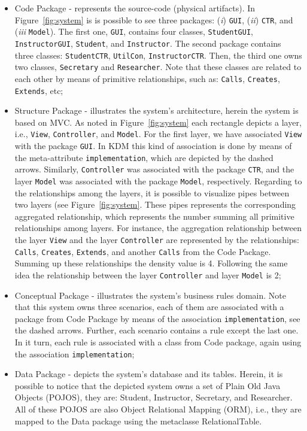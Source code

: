 \begin{itemize}

\item Code Package - represents the source-code (physical artifacts). In Figure~\ref{fig:system} is is possible to see three packages: (\textit{i}) \texttt{GUI}, (\textit{ii}) \texttt{CTR}, and (\textit{iii} \texttt{Model}). The first one, \texttt{GUI}, contains four classes, \texttt{StudentGUI}, \texttt{InstructorGUI}, \texttt{Student}, and \texttt{Instructor}. The second package contains three classes: \texttt{StudentCTR}, \texttt{UtilCon}, \texttt{InstructorCTR}. Then, the third one owns two classes, \texttt{Secretary} and \texttt{Researcher}. Note that these classes are related to each other by means of primitive relationships, such as: \texttt{Calls}, \texttt{Creates}, \texttt{Extends}, etc;

\item Structure Package - illustrates the system's architecture, herein the system is based on MVC. As noted in Figure~\ref{fig:system} each rectangle depicts a layer, i.e., \texttt{View}, \texttt{Controller}, and \texttt{Model}. For the first layer, we have associated \texttt{View} with the package \texttt{GUI}. In KDM this kind of association is done by means of the meta-attribute \texttt{implementation}, which are depicted by the dashed arrows. Similarly, \texttt{Controller} was associated with the package \texttt{CTR}, and the layer \texttt{Model} was associated with the package \texttt{Model}, respectively. Regarding to the relationships among the layers, it is possible to visualize pipes between two layers (see Figure~\ref{fig:system}. These pipes represents the corresponding aggregated relationship, which represents the number summing all primitive relationships among layers. For instance, the aggregation relationship between the layer \texttt{View} and the layer \texttt{Controller} are represented by the relationships: \texttt{Calls}, \texttt{Creates}, \texttt{Extends}, and another \texttt{Calls} from the Code Package. Summing up these relationships the density value is 4. Following the same idea the relationship between the layer \texttt{Controller} and layer \texttt{Model} is 2;  
  
\item Conceptual Package - illustrates the system's business rules domain. Note that this system owns three scenarios, each of them are associated with a package from Code Package by means of the association \texttt{implementation}, see the dashed arrows. Further, each scenario contains a rule except the last one. In it turn, each rule is associated with a class from Code package, again using the association \texttt{implementation};

\item Data Package - depicts the system's database and its tables. Herein, it is possible to notice that the depicted system owns a set of Plain Old Java Objects (POJOS), they are: Student, Instructor, Secretary, and Researcher. All of these POJOS are also Object Relational Mapping (ORM), i.e., they are mapped to the Data package using the metaclasse RelationalTable. 

\end{itemize}

